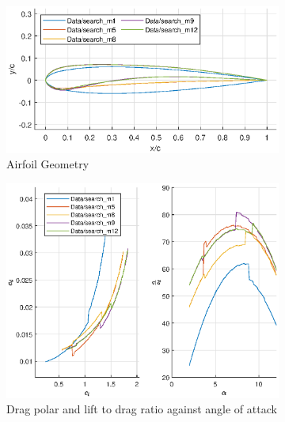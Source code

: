 \documentclass{article}
\begin{document}
\begin{figure}[H]
    \begin{subfigure}{0.54\textwidth}
        \centering
        \includegraphics[width=1.2\textwidth, center]{figures/loRe_geometry_12.eps}
        \caption{Airfoil Geometry}
        \label{fig:m12_geometry}
    \end{subfigure}
    \begin{subfigure}{0.45\textwidth}
        \centering
        \includegraphics[width=1.2\textwidth, center]{figures/loRe_lod_12.eps}
        \caption{Drag polar and lift to drag ratio against angle of attack}
        \label{fig:m12_lod}
    \end{subfigure}
    \caption{}
\end{figure}
\end{document}
